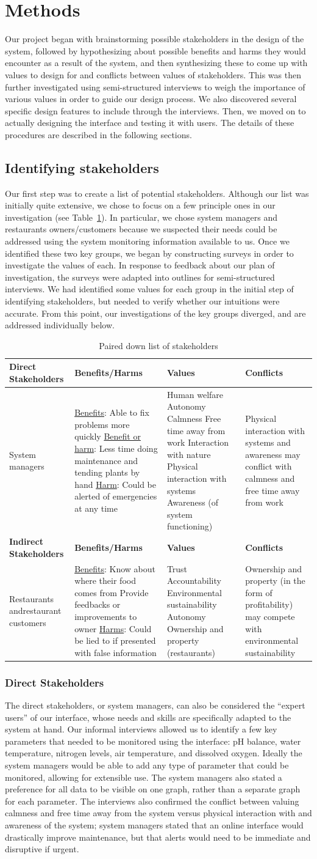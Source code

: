 \documentclass{sigchi}
\newcommand\tabhead[1]{\small\textbf{#1}}
\newcommand{\stakeholdertable}{
\begin{table}
  \centering
  	\begin{tabularx}{0.9\textwidth}{|X|X|X|X|}
    \hline
    \tabhead{Direct Stakeholders} & \tabhead{Benefits/Harms} & \tabhead{Values} & \tabhead{Conflicts} \\
    \hline
    System managers & 
		\underline{Benefits}: Able to fix problems more quickly\newline
		\underline{Benefit or harm}: Less time doing maintenance and tending plants by hand\newline
		\underline{Harm}: Could be alerted of emergencies at any time
	&	Human welfare\newline
	 	Autonomy\newline
		Calmness\newline
		Free time away from work\newline
		Interaction with nature\newline
		Physical interaction with systems\newline
		Awareness (of system functioning)
	& Physical interaction with systems and awareness may conflict with calmness and free time away from work \\
    \hline
    \tabhead{Indirect Stakeholders} & \tabhead{Benefits/Harms} & \tabhead{Values} & \tabhead{Conflicts} \\
    \hline
    Restaurants and\newline restaurant customers &
		\underline{Benefits}: Know about where their food comes from\newline
		Provide feedbacks or improvements to owner\newline
		\underline{Harms}: Could be lied to if presented with false information
	&	Trust\newline
		Accountability\newline
		Environmental sustainability\newline
		Autonomy\newline
		Ownership and property (restaurants)
	&	Ownership and property (in the form of profitability) may compete with environmental sustainability\\
    \hline
  \end{tabularx}
  \caption{Paired down list of stakeholders}
  \label{tab:stakeholders}
\end{table}}
\begin{document}
\section{Methods}

Our project began with brainstorming possible stakeholders in the design of the system, followed by hypothesizing about possible benefits and harms they would encounter as a result of the system, and then synthesizing these to come up with values to design for and conflicts between values of stakeholders. This was then further investigated using semi-structured interviews to weigh the importance of various values in order to guide our design process. We also discovered several specific design features to include through the interviews. Then, we moved on to actually designing the interface and testing it with users. The details of these procedures are described in the following sections. 

\subsection{Identifying stakeholders}

Our first step was to create a list of potential stakeholders. Although our list was initially quite extensive, we chose to focus on a few principle ones in our investigation (see Table~\ref{tab:stakeholders}). In particular, we chose system managers and restaurants owners/customers because we suspected their needs could be addressed using the system monitoring information available to us. Once we identified these two key groups, we began by constructing surveys in order to investigate the values of each. In response to feedback about our plan of investigation, the surveys were adapted into outlines for semi-structured interviews. We had identified some values for each group in the initial step of identifying stakeholders, but needed to verify whether our intuitions were accurate. From this point, our investigations of the key groups diverged, and are addressed individually below. 
\stakeholdertable

\subsubsection{Direct Stakeholders}

The direct stakeholders, or system managers, can also be considered the ``expert users'' of our interface, whose needs and skills are specifically adapted to the system at hand. Our informal interviews allowed us to identify a few key parameters that needed to be monitored using the interface: pH balance, water temperature, nitrogen levels, air temperature, and dissolved oxygen. Ideally the system managers would be able to add any type of parameter that could be monitored, allowing for extensible use. The system managers also stated a preference for all data to be visible on one graph, rather than a separate graph for each parameter. The interviews also confirmed the conflict between valuing calmness and free time away from the system versus physical interaction with and awareness of the system; system managers stated that an online interface would drastically improve maintenance, but that alerts would need to be immediate and disruptive if urgent. 
\end{document}
